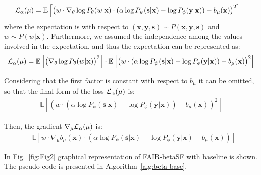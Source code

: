 \documentclass[preprint,12pt]{elsarticle}
\begin{document}
\begin{gather}
	\begin{split}
	&{\cal L}_{\alpha}(\mu) = \mathbb{E} \left[\left(w\cdot\nabla_{\theta}\log P_\theta(w|\mathbf{x})\cdot (\alpha \log P_\psi(\mathbf{s}|\mathbf{x}) - \log P_\phi(\mathbf{y}|\mathbf{x}))  - b_\mu(\mathbf{x})\right)^2 \right]
	\end{split}
\end{gather}
where the expectation is with respect to $(\mathbf{x},\mathbf{y},\mathbf{s})\sim P(\mathbf{x},\mathbf{y},\mathbf{s})$ and $w\sim P(w|\mathbf{x})$.
Furthermore, we assumed the independence among the values involved in the expectation, and thus the expectation can be represented as:
\begin{equation}
	\begin{split}
	{\cal L}_{\alpha}(\mu) = \mathbb{E} \left[\left(\nabla_{\theta}\log P_\theta(w|\mathbf{x})\right)^2 \right] \cdot \mathbb{E} \left[ \left(w \cdot (\alpha \log P_\psi(\mathbf{s}|\mathbf{x}) - \log P_\phi(\mathbf{y}|\mathbf{x})) - b_\mu(\mathbf{x})\right)^2 \right]
	\end{split}
\end{equation}

Considering that the first factor is constant with respect to $b_\mu$ it can be omitted, so that the final form of the loss ${\cal L}_{\alpha}(\mu)$  is:
\begin{equation}
\begin{split}
\mathbb{E} \left[\left(w \cdot (\alpha \log P_\psi(\mathbf{s}|\mathbf{x}) - \log P_\phi(\mathbf{y}|\mathbf{x})) - b_\mu(\mathbf{x})\right)^2\right]
\end{split}
\end{equation}

Then, the gradient $\nabla_\mu{\cal L}_\alpha(\mu)$ is:
\begin{equation}
\begin{split}
-\mathbb{E} \left[w \cdot \nabla_\mu b_\mu(\mathbf{x})\cdot\left(\alpha \log P_\psi(\mathbf{s}|\mathbf{x}) - \log P_\phi(\mathbf{y}|\mathbf{x}) - b_\mu(\mathbf{x})\right)\right]
\end{split}
\end{equation}

In Fig.~\ref{fig:Fig2} graphical representation of FAIR-betaSF with baseline is shown. The pseudo-code is presented in Algorithm~\ref{alg:beta-base}.
\end{document}
